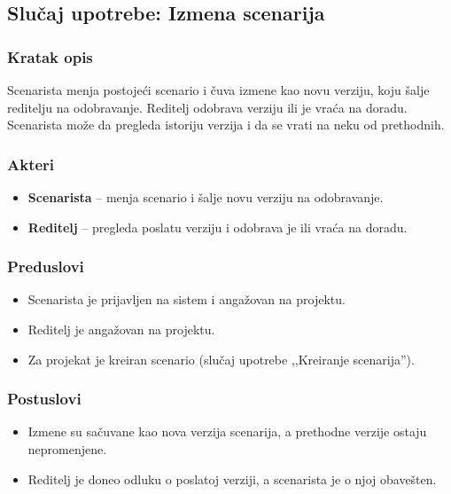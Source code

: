 \subsection{Slučaj upotrebe: Izmena scenarija}

\subsubsection*{Kratak opis}

Scenarista menja postojeći scenario i čuva izmene kao novu verziju, koju šalje
reditelju na odobravanje. Reditelj odobrava verziju ili je vraća na doradu.
Scenarista može da pregleda istoriju verzija i da se vrati na neku od
prethodnih.

\subsubsection*{Akteri}
\begin{itemize}
    \item \textbf{Scenarista} -- menja scenario i šalje novu verziju na odobravanje.
    \item \textbf{Reditelj} -- pregleda poslatu verziju i odobrava je ili vraća na doradu.
\end{itemize}

\subsubsection*{Preduslovi}
\begin{itemize}
    \item Scenarista je prijavljen na sistem i angažovan na projektu.
    \item Reditelj je angažovan na projektu.
    \item Za projekat je kreiran scenario (slučaj upotrebe ,,Kreiranje scenarija'').
\end{itemize}

\subsubsection*{Postuslovi}
\begin{itemize}
    \item Izmene su sačuvane kao nova verzija scenarija, a prethodne verzije ostaju nepromenjene.
    \item Reditelj je doneo odluku o poslatoj verziji, a scenarista je o njoj obavešten.
\end{itemize}

